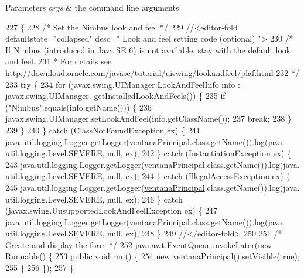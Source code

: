 \begin{DoxyParams}{Parameters}
{\em args} & the command line arguments \\
\hline
\end{DoxyParams}

\begin{DoxyCode}
227                                            \{
228         \textcolor{comment}{/* Set the Nimbus look and feel */}
229         \textcolor{comment}{//<editor-fold defaultstate="collapsed" desc=" Look and feel setting code (optional) ">}
230         \textcolor{comment}{/* If Nimbus (introduced in Java SE 6) is not available, stay with the default look and feel.}
231 \textcolor{comment}{         * For details see http://download.oracle.com/javase/tutorial/uiswing/lookandfeel/plaf.html }
232 \textcolor{comment}{         */}
233         \textcolor{keywordflow}{try} \{
234             \textcolor{keywordflow}{for} (javax.swing.UIManager.LookAndFeelInfo info : javax.swing.UIManager.
      getInstalledLookAndFeels()) \{
235                 \textcolor{keywordflow}{if} (\textcolor{stringliteral}{"Nimbus"}.equals(info.getName())) \{
236                     javax.swing.UIManager.setLookAndFeel(info.getClassName());
237                     \textcolor{keywordflow}{break};
238                 \}
239             \}
240         \} \textcolor{keywordflow}{catch} (ClassNotFoundException ex) \{
241             java.util.logging.Logger.getLogger(\mbox{\hyperlink{classactualizadordoxy_1_1ventana_principal_a6964b4afb82d10ecc070ac305c8e5dd4}{ventanaPrincipal}}.class.getName()).log(java.
      util.logging.Level.SEVERE, null, ex);
242         \} \textcolor{keywordflow}{catch} (InstantiationException ex) \{
243             java.util.logging.Logger.getLogger(\mbox{\hyperlink{classactualizadordoxy_1_1ventana_principal_a6964b4afb82d10ecc070ac305c8e5dd4}{ventanaPrincipal}}.class.getName()).log(java.
      util.logging.Level.SEVERE, null, ex);
244         \} \textcolor{keywordflow}{catch} (IllegalAccessException ex) \{
245             java.util.logging.Logger.getLogger(\mbox{\hyperlink{classactualizadordoxy_1_1ventana_principal_a6964b4afb82d10ecc070ac305c8e5dd4}{ventanaPrincipal}}.class.getName()).log(java.
      util.logging.Level.SEVERE, null, ex);
246         \} \textcolor{keywordflow}{catch} (javax.swing.UnsupportedLookAndFeelException ex) \{
247             java.util.logging.Logger.getLogger(\mbox{\hyperlink{classactualizadordoxy_1_1ventana_principal_a6964b4afb82d10ecc070ac305c8e5dd4}{ventanaPrincipal}}.class.getName()).log(java.
      util.logging.Level.SEVERE, null, ex);
248         \}
249         \textcolor{comment}{//</editor-fold>}
250 
251         \textcolor{comment}{/* Create and display the form */}
252         java.awt.EventQueue.invokeLater(\textcolor{keyword}{new} Runnable() \{
253             \textcolor{keyword}{public} \textcolor{keywordtype}{void} run() \{
254                 \textcolor{keyword}{new} \mbox{\hyperlink{classactualizadordoxy_1_1ventana_principal_a6964b4afb82d10ecc070ac305c8e5dd4}{ventanaPrincipal}}().setVisible(\textcolor{keyword}{true});
255             \}
256         \});
257     \}
\end{DoxyCode}


